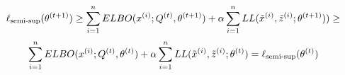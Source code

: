 \begin{answer}
$$\ell_\text{semi-sup}(\theta^{(t+1)}) \ge \sum_{i=1}^{{n}} ELBO(x^{(i)}; Q^{(t)}, \theta^{(t+1)}) + \alpha \sum_{i=1}^{{n}} LL(\tilde{x}^{(i)}, \tilde{z}^{(i)}; \theta^{(t+1)}))  \ge$$
$$\sum_{i=1}^{{n}} ELBO(x^{(i)}; Q^{(t)}, \theta^{(t)}) + \alpha \sum_{i=1}^{{n}} LL(\tilde{x}^{(i)}, \tilde{z}^{(i)}; \theta^{(t)}) = \ell_\text{semi-sup}(\theta^{(t)})$$
\end{answer}
